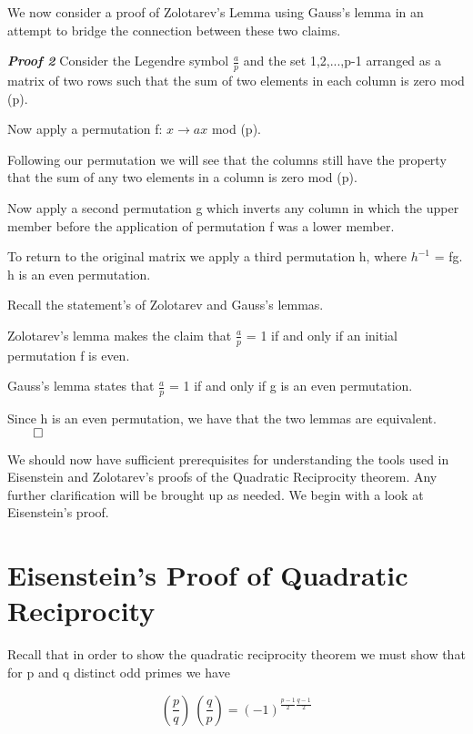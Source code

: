 \documentclass{article}
\begin{document}
\begin{spacing}{1.1}
\vspace{3mm}

We now consider a proof of Zolotarev's Lemma using Gauss's lemma in an attempt to bridge the connection between these two claims.  

\vspace{3mm}

\textbf{\emph{Proof 2}
} Consider the Legendre symbol $\frac{a}{p}$ and the set {1,2,...,p-1} arranged as a matrix of two rows such that the sum of two elements in each column is zero mod (p).  

Now apply a permutation f: $x \rightarrow ax$ mod (p).  

Following our permutation we will see that the columns still have the property that the sum of any two elements in a column is zero mod (p).  

Now apply a second permutation g which inverts any column in which the upper member before the application of permutation f was a lower member.  

To return to the original matrix we apply a third permutation h, where $h^{-1}$ = fg. h is an even permutation.  

Recall the statement's of Zolotarev and Gauss's lemmas.  

Zolotarev's lemma makes the claim that $\frac{a}{p}$ = 1 if and only if an initial permutation f is even.  

Gauss's lemma states that $\frac{a}{p}$ = 1 if and only if g is an even permutation.  

Since h is an even permutation, we have that the two lemmas are equivalent.  $\qed$

\vspace{3mm}

We should now have sufficient prerequisites for understanding the tools used in Eisenstein and Zolotarev's proofs of the Quadratic Reciprocity theorem.  Any further clarification will be brought up as needed.  We begin with a look at Eisenstein's proof.  

\section{Eisenstein's Proof of Quadratic Reciprocity}

Recall that in order to show the quadratic reciprocity theorem we must show that for p and q distinct odd primes we have 

$$
(\frac{p}{q}) \ (\frac{q}{p}) = (-1)^{\frac{p-1}{2}\frac{q-1}{2}}
$$


\end{spacing}
\end{document}

